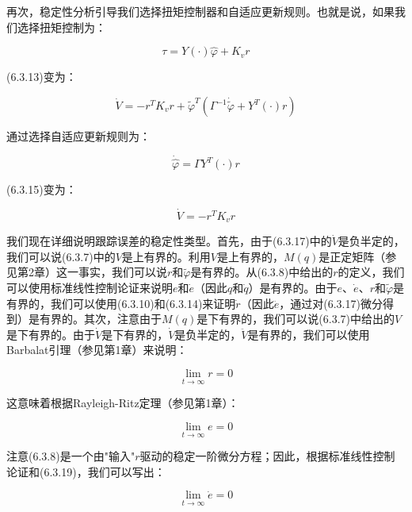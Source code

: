 \documentclass[12pt,a4paper]{ctexart}
\begin{document}
再次，稳定性分析引导我们选择扭矩控制器和自适应更新规则。也就是说，如果我们选择扭矩控制为：

\begin{equation}\label{eq:torque-control}
\tau = Y(\cdot)\hat{\varphi} + K_v r
\end{equation}

(6.3.13)变为：

\begin{equation}\label{eq:v-with-control}
\dot{V} = -r^T K_v r + \tilde{\varphi}^T (\Gamma^{-1} \dot{\tilde{\varphi}} + Y^T(\cdot)r)
\end{equation}

通过选择自适应更新规则为：

\begin{equation}\label{eq:adaptive-update2}
\dot{\hat{\varphi}} = \Gamma Y^T(\cdot)r
\end{equation}

(6.3.15)变为：

\begin{equation}\label{eq:v-negative}
\dot{V} = -r^T K_v r
\end{equation}

我们现在详细说明跟踪误差的稳定性类型。首先，由于(6.3.17)中的$\dot{V}$是负半定的，我们可以说(6.3.7)中的$V$是上有界的。利用$V$是上有界的，$M(q)$是正定矩阵（参见第2章）这一事实，我们可以说$r$和$\tilde{\varphi}$是有界的。从(6.3.8)中给出的$r$的定义，我们可以使用标准线性控制论证来说明$e$和$\dot{e}$（因此$q$和$\dot{q}$）是有界的。由于$e$、$\dot{e}$、$r$和$\tilde{\varphi}$是有界的，我们可以使用(6.3.10)和(6.3.14)来证明$\dot{r}$（因此$\ddot{e}$，通过对(6.3.17)微分得到）是有界的。其次，注意由于$M(q)$是下有界的，我们可以说(6.3.7)中给出的$V$是下有界的。由于$\dot{V}$是下有界的，$\dot{V}$是负半定的，$\ddot{V}$是有界的，我们可以使用Barbalat引理（参见第1章）来说明：

\begin{equation}\label{eq:r-converge}
\lim_{t \to \infty} r = 0
\end{equation}

这意味着根据Rayleigh-Ritz定理（参见第1章）：

\begin{equation}\label{eq:r-converge2}
\lim_{t \to \infty} e = 0
\end{equation}

注意(6.3.8)是一个由"输入"$r$驱动的稳定一阶微分方程；因此，根据标准线性控制论证和(6.3.19)，我们可以写出：

\begin{equation}\label{eq:edot-converge}
\lim_{t \to \infty} \dot{e} = 0
\end{equation}
\end{document}
